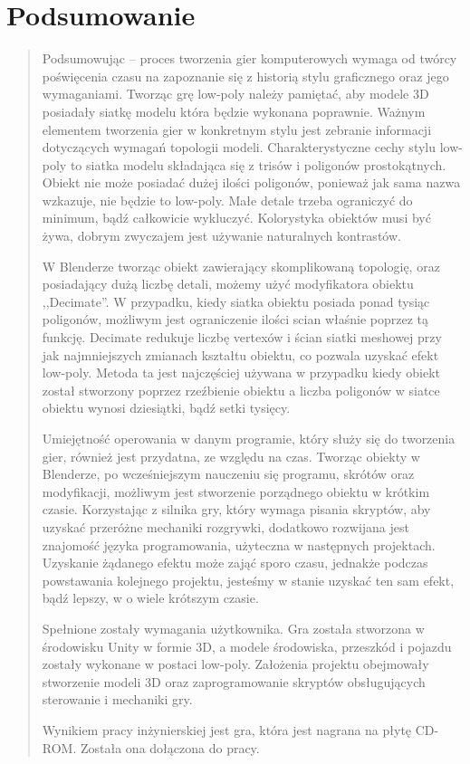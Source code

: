 \newpage
\chapter{Podsumowanie}
\begin{quotation}

\indent Podsumowując -- proces tworzenia gier komputerowych wymaga od twórcy poświęcenia czasu na zapoznanie się z historią stylu graficznego oraz jego wymaganiami. Tworząc grę low-poly należy pamiętać, aby modele 3D posiadały siatkę modelu która będzie wykonana poprawnie. Ważnym elementem tworzenia gier w konkretnym stylu jest zebranie informacji dotyczących wymagań topologii modeli. Charakterystyczne cechy stylu low-poly to siatka modelu składająca się z trisów i poligonów prostokątnych. Obiekt nie może posiadać dużej ilości poligonów, ponieważ jak sama nazwa wzkazuje, nie będzie to low-poly. Małe detale trzeba ograniczyć do minimum, bądź całkowicie wykluczyć. Kolorystyka obiektów musi być żywa, dobrym zwyczajem jest używanie naturalnych kontrastów.

\indent W Blenderze tworząc obiekt zawierający skomplikowaną topologię, oraz posiadający dużą liczbę detali, możemy użyć modyfikatora obiektu ,,Decimate''. W przypadku, kiedy siatka obiektu posiada ponad tysiąc poligonów, możliwym jest ograniczenie ilości scian właśnie poprzez tą funkcję. Decimate redukuje liczbę vertexów i ścian siatki meshowej przy jak najmniejszych zmianach kształtu obiektu, co pozwala uzyskać efekt low-poly. Metoda ta jest najczęściej używana w przypadku kiedy obiekt został stworzony poprzez rzeźbienie obiektu a liczba poligonów w siatce obiektu wynosi dziesiątki, bądź setki tysięcy. 

\indent Umiejętność operowania w danym programie, który służy się do tworzenia gier, również jest przydatna, ze względu na czas. Tworząc obiekty w Blenderze, po wcześniejszym nauczeniu się programu, skrótów oraz modyfikacji, możliwym jest stworzenie porządnego obiektu w krótkim czasie. Korzystając z silnika gry, który wymaga pisania skryptów, aby uzyskać przeróżne mechaniki rozgrywki, dodatkowo rozwijana jest znajomość języka programowania, użyteczna w następnych projektach. Uzyskanie żądanego efektu może zająć sporo czasu, jednakże podczas powstawania kolejnego projektu, jesteśmy w stanie uzyskać ten sam efekt, bądź lepszy, w o wiele krótszym czasie.

\newpage
\indent Spełnione zostały wymagania użytkownika. Gra została stworzona w środowisku Unity w formie 3D, a modele środowiska, przeszkód i pojazdu zostały wykonane w postaci low-poly. Założenia projektu obejmowały stworzenie modeli 3D oraz zaprogramowanie skryptów obsługujących sterowanie i mechaniki gry. 

\indent Wynikiem pracy inżynierskiej jest gra, która jest nagrana na płytę CD-ROM. Została ona dołączona do pracy.
\end{quotation}
